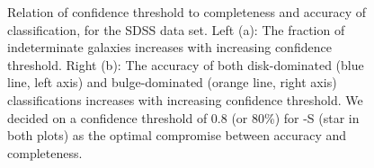 \begin{figure}[htb]
	\begin{center}
  \end{center}
  \caption{Relation of confidence threshold to completeness and accuracy of classification, for the SDSS data set. Left (a): The fraction of indeterminate galaxies increases with increasing confidence threshold.  Right (b): The accuracy of both disk-dominated (blue line, left axis) and bulge-dominated (orange line, right axis) classifications increases with increasing confidence threshold. We decided on a confidence threshold of 0.8 (or 80\%) for \gamornet{}-S (star in both plots) as the optimal compromise between accuracy and completeness.}
  \label{fig:sdss_threshold}
\end{figure}


